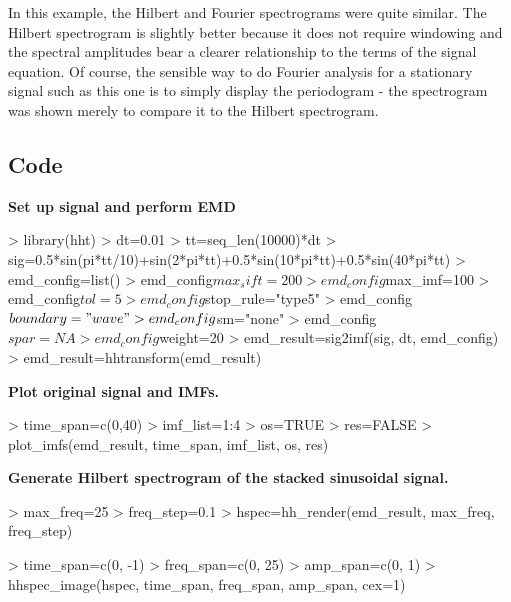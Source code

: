 \documentclass[12pt]{article}
\begin{document}
In this example, the Hilbert and Fourier spectrograms were quite similar. 
The Hilbert spectrogram is slightly better because it does not require windowing and the spectral amplitudes bear a clearer relationship to the terms of the signal equation.
Of course, the sensible way to do Fourier analysis for a stationary signal such as this one is to simply display the periodogram - the spectrogram was shown merely to compare it to the Hilbert spectrogram.

\subsection{Code}

\textbf{Set up signal and perform EMD}
\begin{Schunk}
\begin{Sinput}
> library(hht)
> dt=0.01
> tt=seq_len(10000)*dt
> sig=0.5*sin(pi*tt/10)+sin(2*pi*tt)+0.5*sin(10*pi*tt)+0.5*sin(40*pi*tt)
> emd_config=list()
> emd_config$max_sift=200
> emd_config$max_imf=100
> emd_config$tol=5
> emd_config$stop_rule="type5"
> emd_config$boundary="wave"
> emd_config$sm="none"
> emd_config$spar=NA
> emd_config$weight=20
> emd_result=sig2imf(sig, dt, emd_config)
> emd_result=hhtransform(emd_result)
\end{Sinput}
\end{Schunk}

\textbf{Plot original signal and IMFs.}
\begin{Schunk}
\begin{Sinput}
> time_span=c(0,40)
> imf_list=1:4
> os=TRUE
> res=FALSE
> plot_imfs(emd_result, time_span, imf_list, os, res)
\end{Sinput}
\end{Schunk}

\textbf{Generate Hilbert spectrogram of the stacked sinusoidal signal.}

\begin{Schunk}
\begin{Sinput}
> max_freq=25
> freq_step=0.1
> hspec=hh_render(emd_result, max_freq, freq_step)
\end{Sinput}
\end{Schunk}

\begin{Schunk}
\begin{Sinput}
> time_span=c(0, -1)
> freq_span=c(0, 25)
> amp_span=c(0, 1)
> hhspec_image(hspec, time_span, freq_span, amp_span, cex=1)
\end{Sinput}
\end{Schunk}
\end{document}
